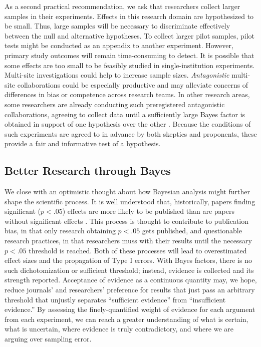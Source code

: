 \documentclass[man]{apa6}
\begin{document}
As a second practical recommendation, we ask that researchers collect larger samples in their experiments. Effects in this research domain are hypothesized to be small. Thus, large samples will be necessary to discriminate effectively between the null and alternative hypotheses. To collect larger pilot samples, pilot tests might be conducted as an appendix to another experiment. However, primary study outcomes will remain time-consuming to detect. It is possible that some effects are too small to be feasibly studied in single-institution experiments. Multi-site investigations could help to increase sample sizes. {\em Antagonistic} multi-site collaborations could be especially productive and may alleviate concerns of differences in bias or competence across research teams. 
In other research areas, some researchers are already conducting such preregistered antagonistic collaborations, agreeing to collect data until a sufficiently large Bayes factor is obtained in support of one hypothesis over the other \citep[e.g.,][]{Matzke:etal:2015}. Because the conditions of such experiments are agreed to in advance by both skeptics and proponents, these provide a fair and informative test of a hypothesis.

\subsection{Better Research through Bayes}
We close with an optimistic thought about how Bayesian analysis might further shape the scientific process. It is well understood that, historically, papers finding significant ($p < .05$) effects are more likely to be published than are papers without significant effects \citep{Atkinson:etal:1982,Cooper:etal:1997,McDaniel:etal:2006}. 
This process is thought to contribute to publication bias, in that only research obtaining $p<.05$ gets published, and questionable research practices, in that researchers muss with their results until the necessary $p < .05$ threshold is reached. Both of these processes will lead to overestimated effect sizes and the propagation of Type I errors. 
With Bayes factors, there is no such dichotomization or sufficient threshold; instead, evidence is collected and its strength reported. Acceptance of evidence as a continuous quantity may, we hope, reduce journals' and researchers' preference for results that just pass an arbitrary threshold that unjustly separates ``sufficient evidence'' from ``insufficient evidence.'' By assessing the finely-quantified weight of evidence for each argument from each experiment, we can reach a greater understanding of what is certain, what is uncertain, where evidence is truly contradictory, and where we are arguing over sampling error.
\end{document}
